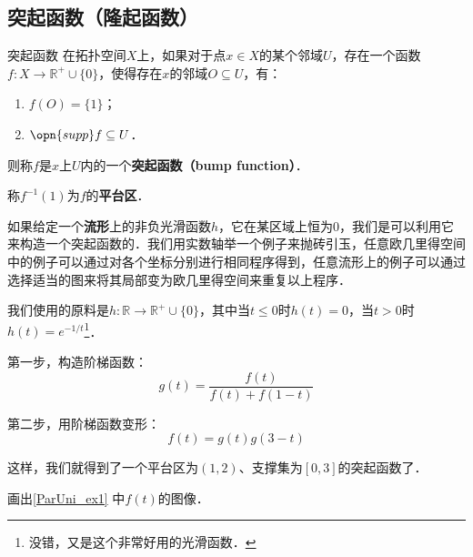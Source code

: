 \subsection{突起函数（隆起函数）}

\begin{definition}{突起函数}
在拓扑空间$X$上，如果对于点$x\in X$的某个邻域$U$，存在一个函数$f:X\to\mathbb{R}^+\cup\{0\}$，使得存在$x$的邻域$O\subseteq U$，有：
\begin{enumerate}
\item $f(O)=\{1\}$；
\item $\opn{supp} f \subseteq U$．
\end{enumerate}
则称$f$是$x$上$U$内的一个\textbf{突起函数（bump function）}．

称$f^{-1}(1)$为$f$的\textbf{平台区}．
\end{definition}

如果给定一个\textbf{流形}上的非负光滑函数$h$，它在某区域上恒为$0$，我们是可以利用它来构造一个突起函数的．我们用实数轴举一个例子来抛砖引玉，任意欧几里得空间中的例子可以通过对各个坐标分别进行相同程序得到，任意流形上的例子可以通过选择适当的图来将其局部变为欧几里得空间来重复以上程序．

\begin{example}{}\label{ParUni_ex1}
我们使用的原料是$h:\mathbb{R}\to\mathbb{R}^+\cup\{0\}$，其中当$t\leq 0$时$h(t)=0$，当$t>0$时$h(t)=e^{-1/t}$\footnote{没错，又是这个非常好用的光滑函数．}．

第一步，构造阶梯函数：
\begin{equation}
g(t)=\frac{f(t)}{f(t)+f(1-t)}
\end{equation}

第二步，用阶梯函数变形：
\begin{equation}
f(t)=g(t)g(3-t)
\end{equation}

这样，我们就得到了一个平台区为$(1, 2)$、支撑集为$[0, 3]$的突起函数了．
\end{example}

\begin{exercise}{}
画出\autoref{ParUni_ex1} 中$f(t)$的图像．
\end{exercise}





